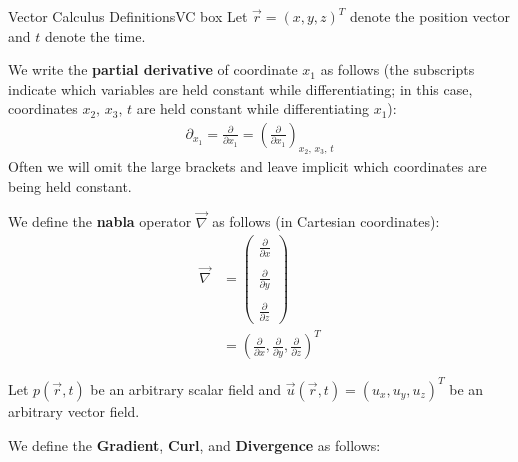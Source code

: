\begin{fact}{Vector Calculus Definitions}{VC box}\label{VC box}
    Let $\vec{r}=(x,y,z)^T$ denote the position vector and $t$ denote the time.\vspace{3mm}

    \begin{minipage}{0.49\linewidth}
        We write the \textbf{partial derivative} of coordinate $x_1$ as follows (the subscripts indicate which variables are held constant while differentiating; in this case, coordinates $x_2, \, x_3,\, t$ are held constant while differentiating $x_1$):
        \begin{align}\label{partial}
            \partial_{x_1}=\frac{\partial}{\partial x_1}=\left( \frac{\partial}{\partial x_1} \right)_{x_2,\,x_3,\,t}
        \end{align}
        Often we will omit the large brackets and leave implicit which coordinates are being held constant.
    \end{minipage}
    \hfill
    \begin{minipage}{0.49\linewidth}
        We define the \textbf{nabla} operator $\vec{\nabla}$ as follows (in Cartesian coordinates):
        \begin{align}
            \vec{\nabla}&=\left( \begin{array}{c}
                \frac{\partial}{\partial x}\\\\
                \frac{\partial}{\partial y}\\\\
                \frac{\partial}{\partial z}
            \end{array} \right)
            \\
            &=\left( \frac{\partial}{\partial x}, \frac{\partial}{\partial y}, \frac{\partial}{\partial z} \right)^T \nonumber
        \end{align}
    \end{minipage}

    \vspace{3mm}Let $p(\vec{r},t)$ be an arbitrary scalar field and $\vec{u}(\vec{r},t)=(u_x,u_y,u_z)^T$ be an arbitrary vector field.

    We define the \textbf{Gradient}, \textbf{Curl}, and \textbf{Divergence} as follows:


\end{fact}
